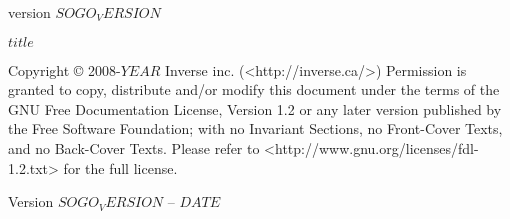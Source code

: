 \thispagestyle{empty}
\begin{figure}[htbp]
\end{figure}

\begin{flushright}
\vspace{2in}
{\selectfont \textmd{\Large version $SOGO_VERSION$}\par}
\bigskip
\textsl{\large $title$}\\
\hspace{1.5cm}\hrulefill
\vfill
\end{flushright}
\newpage

Copyright ©  2008-$YEAR$ Inverse inc. (<http://inverse.ca/>)
Permission is granted to copy, distribute and/or modify this document under the terms of the GNU Free Documentation License,
Version 1.2 or any later version published by the Free Software Foundation; with no Invariant Sections, no Front-Cover Texts, and no Back-Cover Texts.  
Please refer to <http://www.gnu.org/licenses/fdl-1.2.txt> for the full license.

Version $SOGO_VERSION$ – $DATE$

\bigskip
\begin{flushright}
\end{flushright}
\newpage
